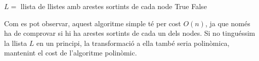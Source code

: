 \documentclass[a4paper]{article}
\begin{document}
\begin{algorithmic}
	\State $L = $ llista de llistes amb arestes sortints de cada node
			\Return True
		\EndIf
	\EndFor
	\Return False
\end{algorithmic}

Com es pot observar, aquest algoritme simple té per cost $O(n)$, ja que només ha de comprovar si hi ha arestes sortints de cada un dels nodes. Si no tinguéssim la llista $L$ en un principi, la transformació a ella també seria polinòmica, mantenint el cost de l’algoritme polinòmic.
\end{document}
